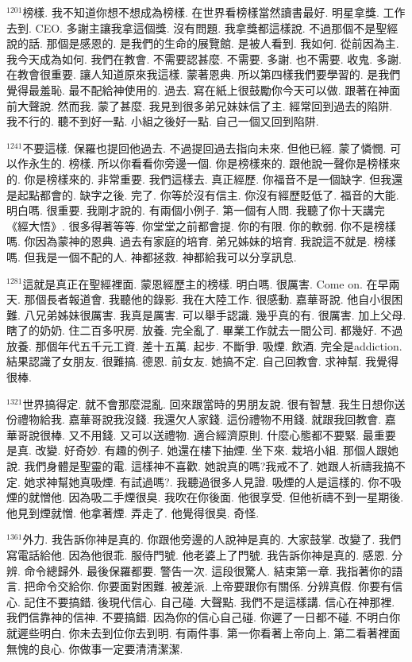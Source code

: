 \documentclass{book}
\begin{document}
$^{1201}$榜樣.
我不知道你想不想成為榜樣.
在世界看榜樣當然讀書最好.
明星拿獎.
工作去到.
CEO.
多謝主讓我拿這個獎.
沒有問題.
我拿獎都這樣說.
不過那個不是聖經說的話.
那個是感恩的.
是我們的生命的展覽館.
是被人看到.
我如何.
從前因為主.
我今天成為如何.
我們在教會.
不需要認甚麼.
不需要.
多謝.
也不需要.
收鬼.
多謝.
在教會很重要.
讓人知道原來我這樣.
蒙著恩典.
所以第四樣我們要學習的.
是我們覺得最羞恥.
最不配給神使用的.
過去.
寫在紙上很鼓勵你今天可以做.
跟著在神面前大聲說.
然而我.
蒙了甚麼.
我見到很多弟兄妹妹信了主.
經常回到過去的陷阱.
我不行的.
聽不到好一點.
小組之後好一點.
自己一個又回到陷阱.

$^{1241}$不要這樣.
保羅也提回他過去.
不過提回過去指向未來.
但他已經.
蒙了憐憫.
可以作永生的.
榜樣.
所以你看看你旁邊一個.
你是榜樣來的.
跟他說一聲你是榜樣來的.
你是榜樣來的.
非常重要.
我們這樣去.
真正經歷.
你福音不是一個缺字.
但我還是起點都會的.
缺字之後.
完了.
你等於沒有信主.
你沒有經歷貶低了.
福音的大能.
明白嗎.
很重要.
我剛才說的.
有兩個小例子.
第一個有人問.
我聽了你十天講完《經大悟》.
很多得著等等.
你堂堂之前都會提.
你的有限.
你的軟弱.
你不是榜樣嗎.
你因為蒙神的恩典.
過去有家庭的培育.
弟兄姊妹的培育.
我說這不就是.
榜樣嗎.
但我是一個不配的人.
神都拯救.
神都給我可以分享訊息.

$^{1281}$這就是真正在聖經裡面.
蒙恩經歷主的榜樣.
明白嗎.
很厲害.
Come on.
在早兩天.
那個長者報道會.
我聽他的錄影.
我在大陸工作.
很感動.
嘉華哥說.
他自小很困難.
八兄弟姊妹很厲害.
我真是厲害.
可以舉手認識.
幾乎真的有.
很厲害.
加上父母.
瞎了的奶奶.
住二百多呎房.
放養.
完全亂了.
畢業工作就去一間公司.
都幾好.
不過放養.
那個年代五千元工資.
差十五萬.
起步.
不斷爭.
吸煙.
飲酒.
完全是addiction.
結果認識了女朋友.
很難搞.
德恩.
前女友.
她搞不定.
自己回教會.
求神幫.
我覺得很棒.

$^{1321}$世界搞得定.
就不會那麼混亂.
回來跟當時的男朋友說.
很有智慧.
我生日想你送份禮物給我.
嘉華哥說我沒錢.
我還欠人家錢.
這份禮物不用錢.
就跟我回教會.
嘉華哥說很棒.
又不用錢.
又可以送禮物.
適合經濟原則.
什麼心態都不要緊.
最重要是真.
改變.
好奇妙.
有趣的例子.
她還在樓下抽煙.
坐下來.
栽培小組.
那個人跟她說.
我們身體是聖靈的電.
這樣神不喜歡.
她說真的嗎?我戒不了.
她跟人祈禱我搞不定.
她求神幫她真吸煙.
有試過嗎?.
我聽過很多人見證.
吸煙的人是這樣的.
你不吸煙的就憎他.
因為吸二手煙很臭.
我吹在你後面.
他很享受.
但他祈禱不到一星期後.
他見到煙就憎.
他拿著煙.
弄走了.
他覺得很臭.
奇怪.

$^{1361}$外力.
我告訴你神是真的.
你跟他旁邊的人說神是真的.
大家鼓掌.
改變了.
我們寫電話給他.
因為他很乖.
服侍門號.
他老婆上了門號.
我告訴你神是真的.
感恩.
分辨.
命令總歸外.
最後保羅都要.
警告一次.
這段很驚人.
結束第一章.
我指著你的語言.
把命令交給你.
你要面對困難.
被差派.
上帝要跟你有關係.
分辨真假.
你要有信心.
記住不要搞錯.
後現代信心.
自己碰.
大聲點.
我們不是這樣講.
信心在神那裡.
我們信靠神的信神.
不要搞錯.
因為你的信心自己碰.
你遲了一日都不碰.
不明白你就遲些明白.
你未去到位你去到明.
有兩件事.
第一你看著上帝向上.
第二看著裡面無愧的良心.
你做事一定要清清潔潔.
\end{document}
